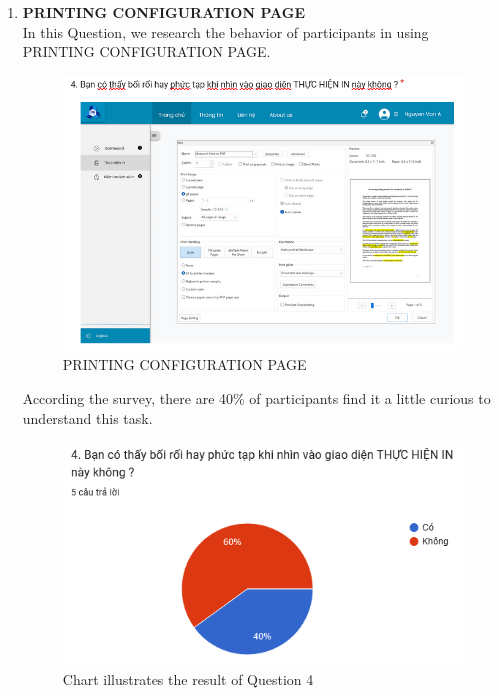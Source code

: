 \begin{enumerate}
    \item \textbf{PRINTING CONFIGURATION PAGE} \\
    In this Question, we research the behavior of participants in using PRINTING CONFIGURATION PAGE.
\begin{figure}[!h]
    \centering
    \includegraphics[width=0.8\linewidth]{images/image_uasbility/Q4_Stu.png}
    \caption{PRINTING CONFIGURATION PAGE}
    \label{fig:PRINTING CONFIGURATION PAGE}
\end{figure}
\newpage
According the survey, there are 40\% of participants find it a little curious to understand this task.
\begin{figure}[!h]
    \centering
    \includegraphics[width=0.8\linewidth]{images/image_uasbility/A4_Stu.png}
    \caption{Chart illustrates the result of Question 4}
    \label{fig:Chart illustrates the result of Question 4}
\end{figure}


\end{enumerate}
